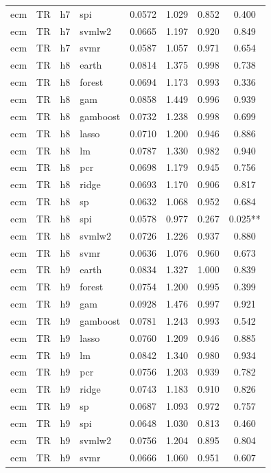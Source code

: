 \begin{ThreePartTable}
\begin{longtable}[t]{llclcccc}
ecm & TR & h7 & spi & 0.0572 & 1.029 & 0.852 & 0.400\\
ecm & TR & h7 & svmlw2 & 0.0665 & 1.197 & 0.920 & 0.849\\
ecm & TR & h7 & svmr & 0.0587 & 1.057 & 0.971 & 0.654\\
\addlinespace
ecm & TR & h8 & earth & 0.0814 & 1.375 & 0.998 & 0.738\\
ecm & TR & h8 & forest & 0.0694 & 1.173 & 0.993 & 0.336\\
ecm & TR & h8 & gam & 0.0858 & 1.449 & 0.996 & 0.939\\
ecm & TR & h8 & gamboost & 0.0732 & 1.238 & 0.998 & 0.699\\
ecm & TR & h8 & lasso & 0.0710 & 1.200 & 0.946 & 0.886\\
ecm & TR & h8 & lm & 0.0787 & 1.330 & 0.982 & 0.940\\
ecm & TR & h8 & pcr & 0.0698 & 1.179 & 0.945 & 0.756\\
ecm & TR & h8 & ridge & 0.0693 & 1.170 & 0.906 & 0.817\\
ecm & TR & h8 & sp & 0.0632 & 1.068 & 0.952 & 0.684\\
ecm & TR & h8 & spi & 0.0578 & 0.977 & 0.267 & 0.025**\\
ecm & TR & h8 & svmlw2 & 0.0726 & 1.226 & 0.937 & 0.880\\
ecm & TR & h8 & svmr & 0.0636 & 1.076 & 0.960 & 0.673\\
\addlinespace
ecm & TR & h9 & earth & 0.0834 & 1.327 & 1.000 & 0.839\\
ecm & TR & h9 & forest & 0.0754 & 1.200 & 0.995 & 0.399\\
ecm & TR & h9 & gam & 0.0928 & 1.476 & 0.997 & 0.921\\
ecm & TR & h9 & gamboost & 0.0781 & 1.243 & 0.993 & 0.542\\
ecm & TR & h9 & lasso & 0.0760 & 1.209 & 0.946 & 0.885\\
ecm & TR & h9 & lm & 0.0842 & 1.340 & 0.980 & 0.934\\
ecm & TR & h9 & pcr & 0.0756 & 1.203 & 0.939 & 0.782\\
ecm & TR & h9 & ridge & 0.0743 & 1.183 & 0.910 & 0.826\\
ecm & TR & h9 & sp & 0.0687 & 1.093 & 0.972 & 0.757\\
ecm & TR & h9 & spi & 0.0648 & 1.030 & 0.813 & 0.460\\
ecm & TR & h9 & svmlw2 & 0.0756 & 1.204 & 0.895 & 0.804\\
ecm & TR & h9 & svmr & 0.0666 & 1.060 & 0.951 & 0.607\\

\end{longtable}
\end{ThreePartTable}
